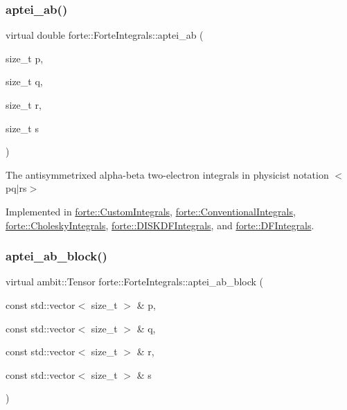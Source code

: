 \subsubsection{\texorpdfstring{aptei\+\_\+ab()}{aptei\_ab()}}
{\footnotesize\ttfamily virtual double forte\+::\+Forte\+Integrals\+::aptei\+\_\+ab (\begin{DoxyParamCaption}\item[{size\+\_\+t}]{p,  }\item[{size\+\_\+t}]{q,  }\item[{size\+\_\+t}]{r,  }\item[{size\+\_\+t}]{s }\end{DoxyParamCaption})\hspace{0.3cm}{\ttfamily [pure virtual]}}



The antisymmetrixed alpha-\/beta two-\/electron integrals in physicist notation $<$pq$\vert$rs$>$ 



Implemented in \mbox{\hyperlink{classforte_1_1_custom_integrals_abfea37dad8b705e35732f3fae06dd151}{forte\+::\+Custom\+Integrals}}, \mbox{\hyperlink{classforte_1_1_conventional_integrals_a7ebb8bcee10a6cbac613e7b626093731}{forte\+::\+Conventional\+Integrals}}, \mbox{\hyperlink{classforte_1_1_cholesky_integrals_aba4876388a8b9b633f38af3fc1cb4227}{forte\+::\+Cholesky\+Integrals}}, \mbox{\hyperlink{classforte_1_1_d_i_s_k_d_f_integrals_aa0ab48ce47dab83c35bf3b9433273f59}{forte\+::\+D\+I\+S\+K\+D\+F\+Integrals}}, and \mbox{\hyperlink{classforte_1_1_d_f_integrals_a01ec88efadb6b8b28bae6c5c3fbfd389}{forte\+::\+D\+F\+Integrals}}.

\mbox{\label{classforte_1_1_forte_integrals_acd40e350dc861baf8adf6a3b47c74023}} 
\subsubsection{\texorpdfstring{aptei\+\_\+ab\+\_\+block()}{aptei\_ab\_block()}}
{\footnotesize\ttfamily virtual ambit\+::\+Tensor forte\+::\+Forte\+Integrals\+::aptei\+\_\+ab\+\_\+block (\begin{DoxyParamCaption}\item[{const std\+::vector$<$ size\+\_\+t $>$ \&}]{p,  }\item[{const std\+::vector$<$ size\+\_\+t $>$ \&}]{q,  }\item[{const std\+::vector$<$ size\+\_\+t $>$ \&}]{r,  }\item[{const std\+::vector$<$ size\+\_\+t $>$ \&}]{s }\end{DoxyParamCaption})\hspace{0.3cm}{\ttfamily [pure virtual]}}


